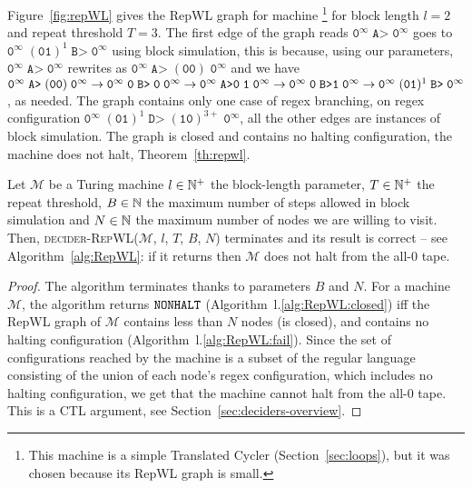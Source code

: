 \begin{example}\label{ex:repWL}
    Figure~\ref{fig:repWL} gives the RepWL graph for machine \footnote{This machine is a simple Translated Cycler (Section~\ref{sec:loops}), but it was chosen because its RepWL graph is small.} for block length $l=2$ and repeat threshold $T=3$. The first edge of the graph reads $\texttt{0}^\infty\; \texttt{A>}\;\texttt{0}^\infty$ goes to $\texttt{0}^\infty\; (\texttt{01})^1\; \texttt{B>}\; \texttt{0}^\infty$ using block simulation, this is because, using our parameters, $\texttt{0}^\infty\; \texttt{A>}\;\texttt{0}^\infty$ rewrites as $\texttt{0}^\infty\; \texttt{A>}\; (\texttt{00})\;\texttt{0}^\infty$ and we have $\texttt{0}^\infty\; \texttt{A>}\; (\texttt{00})\;\texttt{0}^\infty \to \texttt{0}^\infty\;  \texttt{0}\; \texttt{B>}\;\texttt{0}\;\texttt{0}^\infty \to \texttt{0}^\infty\;  \texttt{A>}\texttt{0}\;\texttt{1}\;\texttt{0}^\infty \to \texttt{0}^\infty\;  \texttt{0}\;\texttt{B>}\texttt{1}\;\texttt{0}^\infty \to  \texttt{0}^\infty\; (\texttt{01})^1\; \texttt{B>}\; \texttt{0}^\infty$, as needed. The graph contains only one case of regex branching, on regex configuration $\texttt{0}^\infty\; (\texttt{01})^1\; \texttt{D>}\; (\texttt{10})^{3+}\; \texttt{0}^\infty$, all the other edges are instances of block simulation. The graph is closed and contains no halting configuration, the machine does not halt, Theorem~\ref{th:repwl}.
\end{example}


\begin{theorem}\label{th:repwl}
    Let $\mathcal{M}$ be a Turing machine $l\in \mathbb{N}^+$ the block-length parameter, $T \in \mathbb{N}^+$ the repeat threshold, $B \in \mathbb{N}$ the maximum number of steps allowed in block simulation and $N \in \mathbb{N}$ the maximum number of nodes we are willing to visit. Then, \textsc{decider-RepWL}($\mathcal{M}$, $l$, $T$, $B$, $N$) terminates and its result is correct -- see Algorithm~\ref{alg:RepWL}: if it returns \NONHALT then $\mathcal{M}$ does not halt from the all-$0$ tape.
\end{theorem}
\begin{proof}
    The algorithm terminates thanks to parameters $B$ and $N$. For a machine $\mathcal{M}$, the algorithm returns $\texttt{NONHALT}$ (Algorithm~l.\ref{alg:RepWL:closed}) iff the RepWL graph of $\mathcal{M}$ contains less than $N$ nodes (\ie is closed), and contains no halting configuration (Algorithm~l.\ref{alg:RepWL:fail}). Since the set of configurations reached by the machine is a subset of the regular language consisting of the union of each node's regex configuration, which includes no halting configuration, we get that the machine cannot halt from the all-0 tape. This is a CTL argument, see Section~\ref{sec:deciders-overview}.
\end{proof}



